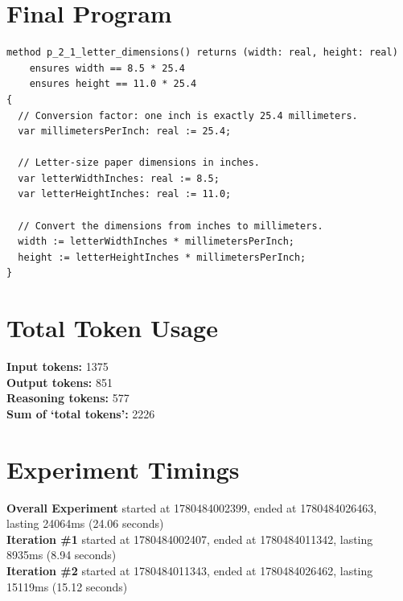 \documentclass{article}
\begin{document}
\section*{Final Program}
\begin{lstlisting}
method p_2_1_letter_dimensions() returns (width: real, height: real)
	ensures width == 8.5 * 25.4
	ensures height == 11.0 * 25.4
{
  // Conversion factor: one inch is exactly 25.4 millimeters.
  var millimetersPerInch: real := 25.4;

  // Letter-size paper dimensions in inches.
  var letterWidthInches: real := 8.5;
  var letterHeightInches: real := 11.0;

  // Convert the dimensions from inches to millimeters.
  width := letterWidthInches * millimetersPerInch;
  height := letterHeightInches * millimetersPerInch;
}
\end{lstlisting}
\section*{Total Token Usage}
\textbf{Input tokens: }1375
\\\textbf{Output tokens: }851
\\\textbf{Reasoning tokens: }577
\\\textbf{Sum of `total tokens': }2226
\section*{Experiment Timings}
\textbf{Overall Experiment} started at 1780484002399, ended at 1780484026463, lasting 24064ms (24.06 seconds)
\\\textbf{Iteration \#1} started at 1780484002407, ended at 1780484011342, lasting 8935ms (8.94 seconds)
\\\textbf{Iteration \#2} started at 1780484011343, ended at 1780484026462, lasting 15119ms (15.12 seconds)
\end{document}
